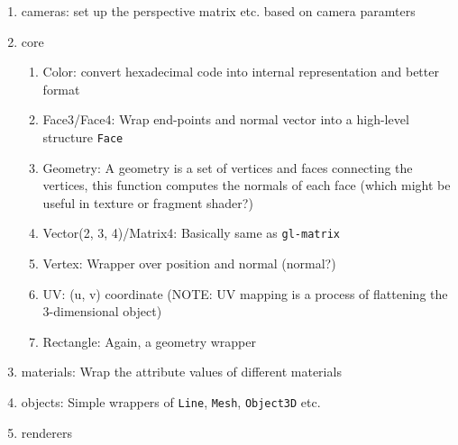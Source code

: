 \documentclass[]{article}
\begin{document}
\begin{enumerate}
\def\labelenumi{\arabic{enumi}.}
\itemsep1pt\parskip0pt
\item
  cameras: set up the perspective matrix etc. based on camera paramters
\item
  core

  \begin{enumerate}
  \def\labelenumii{\arabic{enumii}.}
  \itemsep1pt\parskip0pt
  \item
    Color: convert hexadecimal code into internal representation and
    better format
  \item
    Face3/Face4: Wrap end-points and normal vector into a high-level
    structure \texttt{Face}
  \item
    Geometry: A geometry is a set of vertices and faces connecting the
    vertices, this function computes the normals of each face (which
    might be useful in texture or fragment shader?)
  \item
    Vector(2, 3, 4)/Matrix4: Basically same as \texttt{gl-matrix}
  \item
    Vertex: Wrapper over position and normal (normal?)
  \item
    UV: (u, v) coordinate (NOTE: UV mapping is a process of flattening
    the 3-dimensional object)
  \item
    Rectangle: Again, a geometry wrapper
  \end{enumerate}
\item
  materials: Wrap the attribute values of different materials
\item
  objects: Simple wrappers of \texttt{Line}, \texttt{Mesh},
  \texttt{Object3D} etc.
\item
  renderers


\end{enumerate}
\end{document}
